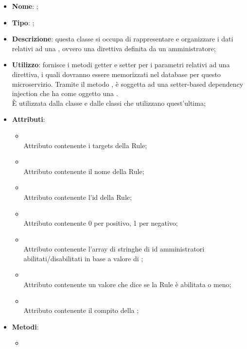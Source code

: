 \begin{itemize}
	\item \textbf{Nome}: ;
	\item \textbf{Tipo}: ;
	\item \textbf{Descrizione}: questa classe si occupa di rappresentare e organizzare i dati relativi ad una , ovvero una direttiva definita da un amministratore;
	\item \textbf{Utilizzo}: fornisce i metodi getter e setter per i parametri relativi ad una direttiva, i quali dovranno essere memorizzati nel database per questo microservizio. Tramite il metodo , è soggetta ad una setter-based dependency injection che ha come oggetto una . \\
È utilizzata dalla classe  e dalle classi che utilizzano quest'ultima;
	\item \textbf{Attributi}:
	\begin{itemize}
		\item[]  \\
		Attributo contenente i targets della Rule;
		\item[]  \\
		Attributo contenente il nome della Rule;
		\item[]  \\
		Attributo contenente l'id della Rule;
		\item[]  \\
		Attributo contenente 0 per positivo, 1 per negativo;
		\item[]  \\
		Attributo contenente l'array di stringhe di id amministratori abilitati/disabilitati in base a valore di ;
		\item[]  \\
		Attributo contenente un valore che dice se la Rule è abilitata o meno;
		\item[]  \\
		Attributo contenente il compito della ;
	\end{itemize}
	\item \textbf{Metodi}:
	\begin{itemize}
		\item[]  \\

\end{itemize}
\end{itemize}
